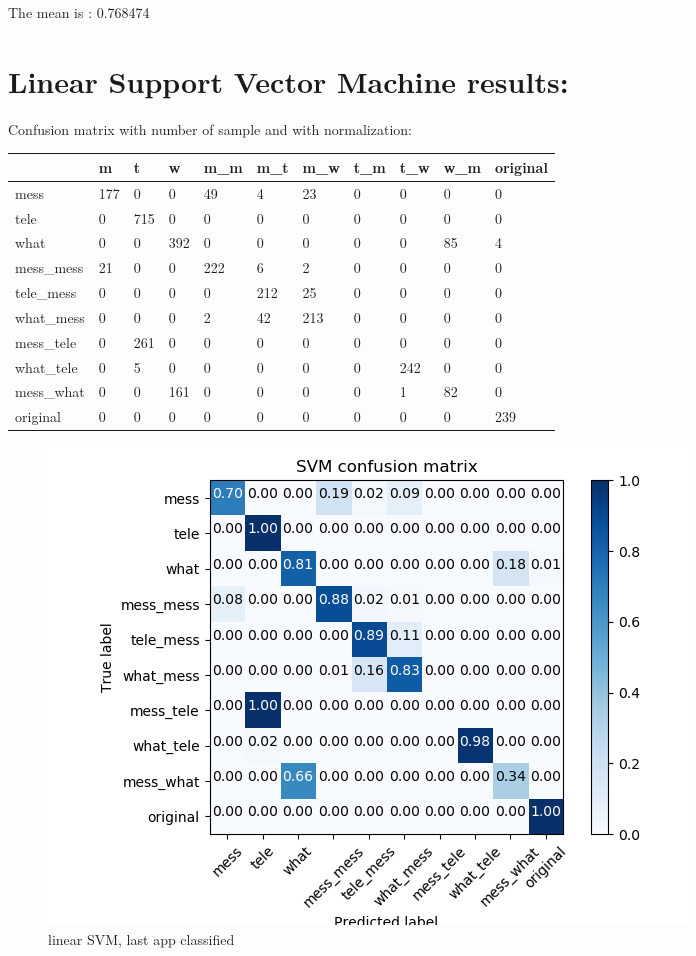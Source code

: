 The mean is : 0.768474\section{Linear Support Vector Machine results:} 
Confusion matrix with number of sample and with normalization:
 {\def\arraystretch{1.3} 
 \begin{table}[H] 
\centering 
\begin{tabular}{|l|l|l|l|l|l|l|l|l|l|l|} 
\hline 
  &m  &t  &w  &m\_m  &m\_t  &m\_w  &t\_m  &t\_w  &w\_m  &original  \\ \hline
mess  &177  &0  &0  &49  &4  &23  &0  &0  &0  &0  \\ \hline
tele  &0  &715  &0  &0  &0  &0  &0  &0  &0  &0  \\ \hline
what  &0  &0  &392  &0  &0  &0  &0  &0  &85  &4  \\ \hline
mess\_mess  &21  &0  &0  &222  &6  &2  &0  &0  &0  &0  \\ \hline
tele\_mess  &0  &0  &0  &0  &212  &25  &0  &0  &0  &0  \\ \hline
what\_mess  &0  &0  &0  &2  &42  &213  &0  &0  &0  &0  \\ \hline
mess\_tele  &0  &261  &0  &0  &0  &0  &0  &0  &0  &0  \\ \hline
what\_tele  &0  &5  &0  &0  &0  &0  &0  &242  &0  &0  \\ \hline
mess\_what  &0  &0  &161  &0  &0  &0  &0  &1  &82  &0  \\ \hline
original  &0  &0  &0  &0  &0  &0  &0  &0  &0  &239  \\ \hline
\end{tabular} 
\end{table} }

 \begin{figure}[H] 
\centering 
\includegraphics[scale=.6]{images/new_met_lsvm_initial_single_double_complete.png} 
\caption{linear SVM, last app classified} 
\end{figure} 


